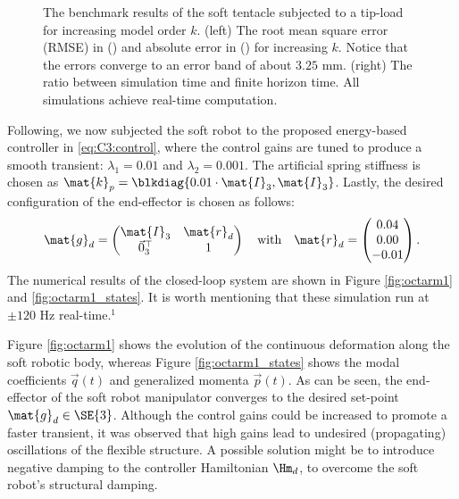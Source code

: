 \begin{figure}[!t]
\centering
 
\caption{The benchmark results of the soft tentacle subjected to a tip-load for increasing model order $k$. (left) The root mean square error (RMSE) in () and absolute error in () for increasing $k$. Notice that the errors converge to an error band of about $3.25$ \si{\milli \meter}. (right) The ratio between simulation time and finite horizon time. All simulations achieve real-time computation. }
\vspace{-0.2cm}
\label{fig:C3:EX2:mode_convergence_bench}
\end{figure}
\begin{example}
Following, we now subjected the soft robot to the proposed energy-based controller in \eqref{eq:C3:control}, where the control gains are tuned to produce a smooth transient: $\lambda_1 = 0.01$ and $\lambda_2 = 0.001$. The artificial spring stiffness is chosen as $\mat{k}_p = \blkdiag{0.01\cdot \mat{I}_3, \mat{I}_3}$. Lastly, the desired configuration of the end-effector is chosen as follows:
%
\begin{equation*}
\mat{g}_d = \begin{pmatrix} \mat{I}_3 & \mat{r}_d \\ \vec{0}_3^\top & 1 \end{pmatrix} \quad \text{with} \quad \mat{r}_d = \begin{pmatrix}  0.04 \\ 0.00 \\ -0.01  \end{pmatrix}.
\end{equation*}
%
The numerical results of the closed-loop system are shown in Figure \ref{fig:octarm1} and \ref{fig:octarm1_states}. It is worth mentioning that these simulation run at $\pm120$ \si{\hertz} real-time.$^{1}$  

Figure \ref{fig:octarm1} shows the evolution of the continuous deformation along the soft robotic body, whereas Figure \ref{fig:octarm1_states} shows the modal coefficients $\vec{q}(t)$ and generalized momenta $\vec{p}(t)$. As can be seen, the end-effector of the soft robot manipulator converges to the desired set-point $\mat{g}_d \in \SE{3}$. Although the control gains could be increased to promote a faster transient, it was observed that high gains lead to undesired (propagating) oscillations of the flexible structure. A possible solution might be to introduce negative damping to the controller Hamiltonian $\Hm_d$, to overcome the soft robot's structural damping.


\end{example}
